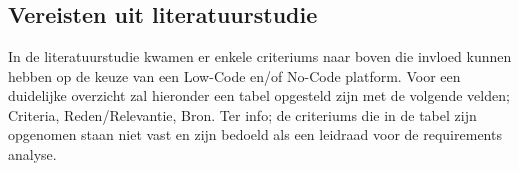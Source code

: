 \chapter{}%
\label{ch:vereisten}
\section{Vereisten uit literatuurstudie}%
\label{sec:vereisten-literatuurstudie}
In de literatuurstudie kwamen er enkele criteriums naar boven die invloed kunnen hebben op 
de keuze van een Low-Code en/of No-Code platform. Voor een duidelijke overzicht zal hieronder een tabel opgesteld zijn met de volgende velden; 
Criteria, Reden/Relevantie, Bron. Ter info; de criteriums die in de tabel zijn opgenomen 
staan niet vast en zijn bedoeld als een leidraad voor de requirements analyse.
